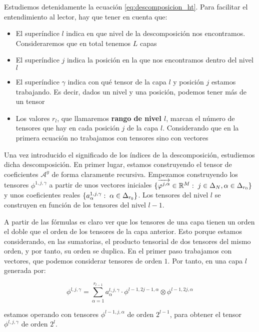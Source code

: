 Estudiemos detenidamente la ecuación \eqref{eq:descomposicion_ht}. Para facilitar el entendimiento al lector, hay que tener en cuenta que:

\begin{itemize}
    \item El superíndice $l$ indica en que nivel de la descomposición nos encontramos. Consideraremos que en total tenemos $L$ capas
    \item El superíndice $j$ indica la posición en la que nos encontramos dentro del nivel $l$
    \item El superíndice $\gamma$ indica con qué tensor de la capa $l$ y posición $j$ estamos trabajando. Es decir, dados un nivel y una posición, podemos tener más de un tensor
    \item Los valores $r_l$, que llamaremos \textbf{rango de nivel $l$}, marcan el número de tensores que hay en cada posición $j$ de la capa $l$. Considerando que en la primera ecuación no trabajamos con tensores sino con vectores
\end{itemize}

Una vez introducido el significado de los índices de la descomposición, estudiemos dicha descomposición. En primer lugar, estamos construyendo el tensor de coeficientes $\mathcal{A}^y$ de forma claramente recursiva. Empezamos construyendo los tensores $\phi^{1, j, \gamma}$ a partir de unos vectores iniciales $\{\overrightarrow{\varphi^{j, \alpha}} \in \mathbb{R}^M: \; j \in \Delta_{N}, \alpha \in \Delta_{r_0}  \}$  y unos coeficientes reales $\{a_{\alpha}^{1, j, \gamma}: \; \alpha \in \Delta_{r_0}\}$. Los tensores del nivel $l$ se construyen en función de los tensores del nivel $l-1$.

A partir de las fórmulas es claro ver que los tensores de una capa tienen un orden el doble que el orden de los tensores de la capa anterior. Esto porque estamos considerando, en las sumatorias, el producto tensorial de dos tensores del mismo orden, y por tanto, su orden se duplica. En el primer paso trabajamos con vectores, que podemos considerar tensores de orden $1$. Por tanto, en una capa $l$ generada por:

\begin{equation}
    \phi^{l, j, \gamma} = \sum_{\alpha = 1}^{r_{l-1}} a_{\alpha}^{l, j, \gamma} \cdot \phi^{l-1, 2j-1, \alpha} \otimes \phi^{l-1, 2j, \alpha}
\end{equation}

estamos operando con tensores $\phi^{l-1, j, \alpha}$ de orden $2^{l-1}$, para obtener el tensor $\phi^{l, j, \gamma}$ de orden $2^l$.

